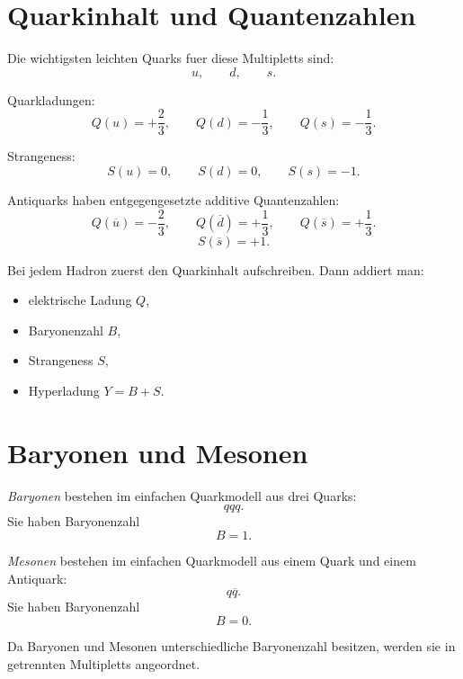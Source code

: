 \section{Quarkinhalt und Quantenzahlen}

Die wichtigsten leichten Quarks fuer diese Multipletts sind:
\[
    u,\qquad d,\qquad s.
\]

\begin{notebox}
Quarkladungen:
\[
    Q(u)=+\frac{2}{3},
    \qquad
    Q(d)=-\frac{1}{3},
    \qquad
    Q(s)=-\frac{1}{3}.
\]

Strangeness:
\[
    S(u)=0,
    \qquad
    S(d)=0,
    \qquad
    S(s)=-1.
\]
\end{notebox}

\begin{notebox}
Antiquarks haben entgegengesetzte additive Quantenzahlen:
\[
    Q(\overline{u})=-\frac{2}{3},
    \qquad
    Q(\overline{d})=+\frac{1}{3},
    \qquad
    Q(\overline{s})=+\frac{1}{3}.
\]
\[
    S(\overline{s})=+1.
\]
\end{notebox}

\begin{examtipbox}
Bei jedem Hadron zuerst den Quarkinhalt aufschreiben.
Dann addiert man:
\begin{itemize}
    \item elektrische Ladung $Q$,
    \item Baryonenzahl $B$,
    \item Strangeness $S$,
    \item Hyperladung $Y=B+S$.
\end{itemize}
\end{examtipbox}

\section{Baryonen und Mesonen}

\begin{definitionbox}
\emph{Baryonen} bestehen im einfachen Quarkmodell aus drei Quarks:
\[
    qqq.
\]
Sie haben Baryonenzahl
\[
    B=1.
\]
\end{definitionbox}

\begin{definitionbox}
\emph{Mesonen} bestehen im einfachen Quarkmodell aus einem Quark und einem Antiquark:
\[
    q\overline{q}.
\]
Sie haben Baryonenzahl
\[
    B=0.
\]
\end{definitionbox}

\begin{conceptbox}
Da Baryonen und Mesonen unterschiedliche Baryonenzahl besitzen, werden sie in
getrennten Multipletts angeordnet.
\end{conceptbox}

